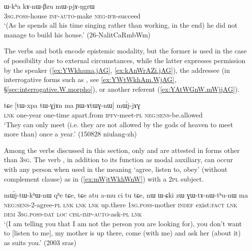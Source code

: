\begin{exe} 
\ex \label{ex:kAnWBzu.mWpjANgrW}
\gll ɯ-kʰa kɤ-nɯ-βzu mɯ-pjɤ-ŋgrɯ \\
\textsc{3sg}.\textsc{poss}-house \textsc{inf}-\textsc{auto}-make \textsc{neg}-\textsc{ifr}-succeed \\
\glt `(As he spends all his time singing rather than working, in the end) he did not manage to build his house.' (26-NalitCaRmbWm)
\end{exe}


The verbs  and  both encode epistemic modality, but the former is used in the case of possibility due to external circumstances, while the latter expresses permission by the speaker (\ref{ex:YWkhama.jAG}, \ref{ex:kAnWrAZi.jAG}), the addressee (in interrogative forms such as , see \ref{ex:YWtWkhAm.WjAG}, §\ref{sec:interrogative.W.morpho}), or another referent (\ref{ex:YAtWGnW.mWjjAG}). 


\begin{exe} 
\ex \label{ex:YAtWGnW.mWjjAG}
\gll tɕe [tɯ-xpa tɯ-ɣjɤn ma ɲɯ-ɤtɯɣ-nɯ] mɯ́j-jɤɣ \\
\textsc{lnk} one-year one-time apart.from \textsc{ipfv}-meet-\textsc{pl} \textsc{neg}:\textsc{sens}-be.allowed \\
\glt `They can only meet (i.e. they are not allowed by the gods of heaven to meet more than) once a year.' (150828 niulang-zh)
\end{exe}

Among the verbs discussed in this section, only  and  are attested in forms other than \textsc{3sg}. The verb , in addition to its function as modal auxiliary, can occur with any person when used in the meaning `agree, listen to, obey' (without complement clause) as in (\ref{ex:mWjtWkhWnW}) with a \textsc{2pl} subject.

\begin{exe} 
\ex \label{ex:mWjtWkhWnW}
\gll mɯ́j-tɯ-kʰɯ-nɯ qʰe tɕe, tɕe atu a-mu ci tu tɕe, nɯ ɯ-ɕki zɯ ɣɯ-tɤ-nɯ-tʰu-nɯ ma \\
\textsc{neg}:\textsc{sens}-2-agree-\textsc{pl} \textsc{lnk} \textsc{lnk} \textsc{lnk} up.there \textsc{1sg}.\textsc{poss}-mother \textsc{indef} exist:\textsc{fact} \textsc{lnk} \textsc{dem} \textsc{3sg}.\textsc{poss}-\textsc{dat} \textsc{loc} \textsc{cisl}-\textsc{imp}-\textsc{auto}-ask-\textsc{pl} \textsc{lnk} \\
\glt `(I am telling you that I am not the person you are looking for), you don't want to [listen to me], 
my mother is up there, come (with me) and ask her (about it) as suits you.' (2003 sras)
\end{exe} 

